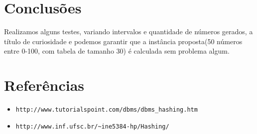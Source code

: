 \documentclass[a4paper]{report}
\begin{document}
\section{Conclusões}

Realizamos alguns testes, variando intervalos e quantidade de números gerados, a título de curiosidade e podemos garantir que a instância proposta(50 números entre 0-100, com tabela de tamanho 30) é calculada sem problema algum.

\section{Referências}

\begin{itemize}

\item \begin{verbatim}http://www.tutorialspoint.com/dbms/dbms_hashing.htm\end{verbatim}

\item \begin{verbatim}http://www.inf.ufsc.br/~ine5384-hp/Hashing/\end{verbatim}

\end{itemize}
\end{document}
